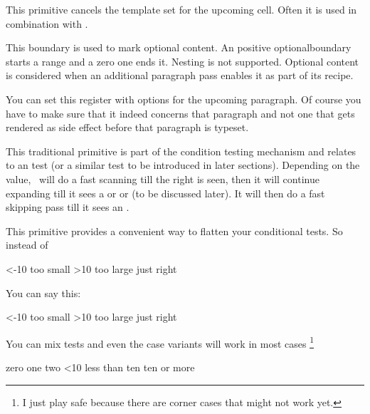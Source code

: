 \stopnewprimitive

\startoldprimitive[title={\prm {omit}}]

This primitive cancels the template set for the upcoming cell. Often it is used
in combination with .

\stopoldprimitive

\startnewprimitive[title={\prm {optionalboundary}}]

This boundary is used to mark optional content. An positive \prm
{optionalboundary} starts a range and a zero one ends it. Nesting is not
supported. Optional content is considered when an additional paragraph pass
enables it as part of its recipe.

\stopnewprimitive

\startnewprimitive[title={\prm {optionspar}}]

You can set this register with options for the upcoming paragraph. Of course you
have to make sure that it indeed concerns that paragraph and not one that gets
rendered as side effect before that paragraph is typeset. \stopnewprimitive

\startoldprimitive[title={\prm {or}}]

This traditional primitive is part of the condition testing mechanism and relates
to an  test (or a similar test to be introduced in later
sections). Depending on the value, \TEX\ will do a fast scanning till the right
 is seen, then it will continue expanding till it sees a 
or  or  (to be discussed later). It will then do a
fast skipping pass till it sees an .

\stopoldprimitive

\startnewprimitive[title={\prm {orelse}}]

This primitive provides a convenient way to flatten your conditional tests. So
instead of

\starttyping
\ifnum\scratchcounter<-10
    too small
\else\ifnum\scratchcounter>10
    too large
\else
    just right
\fi\fi
\stoptyping

You can say this:

\starttyping
\ifnum\scratchcounter<-10
    too small
\orelse\ifnum\scratchcounter>10
    too large
\else
    just right
\fi
\stoptyping

You can mix tests and even the case variants will work in most cases \footnote {I
just play safe because there are corner cases that might not work yet.}

\starttyping
\ifcase\scratchcounter          zero
\or                             one
\or                             two
\orelse\ifnum\scratchcounter<10 less than ten
\else                           ten or more
\fi
\stoptyping

